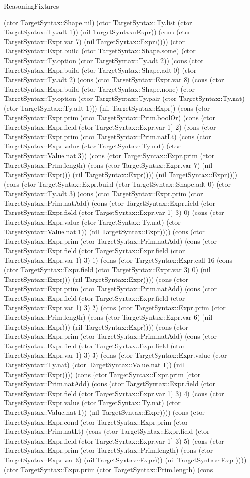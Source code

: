\begin{lexlean}{ReasoningFixtures}
\begin{semanticmodule}
{(ctor TargetSyntax::Shape.nil) (ctor TargetSyntax::Ty.list (ctor TargetSyntax::Ty.adt 1)) (nil TargetSyntax::Expr)) (cons (ctor TargetSyntax::Expr.var 7) (nil TargetSyntax::Expr))))) (ctor TargetSyntax::Expr.build (ctor TargetSyntax::Shape.some) (ctor TargetSyntax::Ty.option (ctor TargetSyntax::Ty.adt 2)) (cons (ctor TargetSyntax::Expr.build (ctor TargetSyntax::Shape.adt 0) (ctor TargetSyntax::Ty.adt 2) (cons (ctor TargetSyntax::Expr.var 8) (cons (ctor TargetSyntax::Expr.build (ctor TargetSyntax::Shape.none) (ctor TargetSyntax::Ty.option (ctor TargetSyntax::Ty.pair (ctor TargetSyntax::Ty.nat) (ctor TargetSyntax::Ty.adt 1))) (nil TargetSyntax::Expr)) (cons (ctor TargetSyntax::Expr.prim (ctor TargetSyntax::Prim.boolOr) (cons (ctor TargetSyntax::Expr.field (ctor TargetSyntax::Expr.var 1) 2) (cons (ctor TargetSyntax::Expr.prim (ctor TargetSyntax::Prim.natLt) (cons (ctor TargetSyntax::Expr.value (ctor TargetSyntax::Ty.nat) (ctor TargetSyntax::Value.nat 3)) (cons (ctor TargetSyntax::Expr.prim (ctor TargetSyntax::Prim.length) (cons (ctor TargetSyntax::Expr.var 7) (nil TargetSyntax::Expr))) (nil TargetSyntax::Expr)))) (nil TargetSyntax::Expr)))) (cons (ctor TargetSyntax::Expr.build (ctor TargetSyntax::Shape.adt 0) (ctor TargetSyntax::Ty.adt 3) (cons (ctor TargetSyntax::Expr.prim (ctor TargetSyntax::Prim.natAdd) (cons (ctor TargetSyntax::Expr.field (ctor TargetSyntax::Expr.field (ctor TargetSyntax::Expr.var 1) 3) 0) (cons (ctor TargetSyntax::Expr.value (ctor TargetSyntax::Ty.nat) (ctor TargetSyntax::Value.nat 1)) (nil TargetSyntax::Expr)))) (cons (ctor TargetSyntax::Expr.prim (ctor TargetSyntax::Prim.natAdd) (cons (ctor TargetSyntax::Expr.field (ctor TargetSyntax::Expr.field (ctor TargetSyntax::Expr.var 1) 3) 1) (cons (ctor TargetSyntax::Expr.call 16 (cons (ctor TargetSyntax::Expr.field (ctor TargetSyntax::Expr.var 3) 0) (nil TargetSyntax::Expr))) (nil TargetSyntax::Expr)))) (cons (ctor TargetSyntax::Expr.prim (ctor TargetSyntax::Prim.natAdd) (cons (ctor TargetSyntax::Expr.field (ctor TargetSyntax::Expr.field (ctor TargetSyntax::Expr.var 1) 3) 2) (cons (ctor TargetSyntax::Expr.prim (ctor TargetSyntax::Prim.length) (cons (ctor TargetSyntax::Expr.var 6) (nil TargetSyntax::Expr))) (nil TargetSyntax::Expr)))) (cons (ctor TargetSyntax::Expr.prim (ctor TargetSyntax::Prim.natAdd) (cons (ctor TargetSyntax::Expr.field (ctor TargetSyntax::Expr.field (ctor TargetSyntax::Expr.var 1) 3) 3) (cons (ctor TargetSyntax::Expr.value (ctor TargetSyntax::Ty.nat) (ctor TargetSyntax::Value.nat 1)) (nil TargetSyntax::Expr)))) (cons (ctor TargetSyntax::Expr.prim (ctor TargetSyntax::Prim.natAdd) (cons (ctor TargetSyntax::Expr.field (ctor TargetSyntax::Expr.field (ctor TargetSyntax::Expr.var 1) 3) 4) (cons (ctor TargetSyntax::Expr.value (ctor TargetSyntax::Ty.nat) (ctor TargetSyntax::Value.nat 1)) (nil TargetSyntax::Expr)))) (cons (ctor TargetSyntax::Expr.cond (ctor TargetSyntax::Expr.prim (ctor TargetSyntax::Prim.natLt) (cons (ctor TargetSyntax::Expr.field (ctor TargetSyntax::Expr.field (ctor TargetSyntax::Expr.var 1) 3) 5) (cons (ctor TargetSyntax::Expr.prim (ctor TargetSyntax::Prim.length) (cons (ctor TargetSyntax::Expr.var 8) (nil TargetSyntax::Expr))) (nil TargetSyntax::Expr)))) (ctor TargetSyntax::Expr.prim (ctor TargetSyntax::Prim.length) (cons }
\end{semanticmodule}
\end{lexlean}
